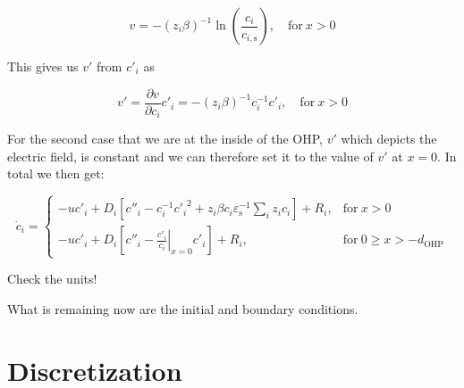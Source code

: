 \documentclass[10pt,a4paper]{article}
\begin{document}
\begin{equation}
v = -\left(z_i \beta\right)^{-1}\ln\left(\frac{c_i}{c_{i,\mathrm{s}}}\right), \quad \mathrm{for}~ x > 0
\end{equation}

This gives us $v'$ from $c'_i$ as

\begin{equation}
v' = \frac{\partial v}{\partial c_i} c'_i = -\left(z_i \beta\right)^{-1} c_i^{-1} c'_i, \quad \mathrm{for}~ x > 0
\end{equation}

For the second case that we are at the inside of the OHP, $v'$ which depicts the electric field, is constant and we can therefore set it to the value of $v'$ at $x=0$. In total we then get:

\begin{equation}
\dot{c}_i =\left.
\begin{cases}
-u c'_i + D_i \left[c''_i - c_i^{-1} {c'_i}^2 + z_i \beta c_i \varepsilon_\mathrm{s}^{-1} \sum\limits_i z_i c_i\right] + R_i,& \mathrm{for}~ x > 0\\
-u c'_i + D_i \left[c''_i - \left.\frac{c'_i}{c_i}\right|_{x=0} c'_i\right] + R_i, & \mathrm{for}~ 0 \geq x > -d_\mathrm{OHP}
\end{cases}
\right.
\end{equation}

Check the units!

What is remaining now are the initial and boundary conditions.

\section{Discretization}
\end{document}
